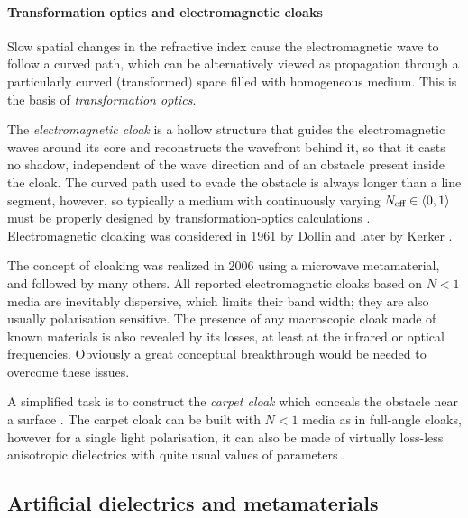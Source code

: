 \paragraph{Transformation optics and electromagnetic cloaks} %
Slow spatial changes in the refractive index cause the electromagnetic wave to follow a curved path, which can be alternatively viewed as propagation through a particularly curved (transformed) space filled with homogeneous medium. This is the basis of \textit{transformation optics}.

The \textit{electromagnetic cloak} is a hollow structure that guides the electromagnetic waves around its core and reconstructs the wavefront behind it, so that it casts no shadow, independent of the wave direction and of an obstacle present inside the cloak. 
The curved path used to evade the obstacle is always longer than a line segment, however, so typically a medium with continuously varying $N_{\text{eff} }\in \langle0,1\rangle$ must be properly designed by transformation-optics calculations \cite{eleftheriades2012transforming}.
Electromagnetic cloaking %
was considered in 1961 by Dollin \cite{dollin1961possibility} and later by Kerker \cite{kerker1975invisible}.

The concept of cloaking was realized \cite{schurig2006metamaterial} in 2006 using a microwave metamaterial, and followed by many others.
All reported electromagnetic cloaks based on $N<1$ media are inevitably dispersive, which limits their band width; they are also usually polarisation sensitive. The presence of any macroscopic cloak made of known materials is also revealed by its losses, at least at the infrared or optical frequencies. Obviously a great conceptual breakthrough would be needed to overcome these issues. 

A simplified task is to construct the \textit{carpet cloak} which conceals the obstacle near a surface \cite{valentine2009optical}.
The carpet cloak can be built with $N<1$ media as in full-angle cloaks, however for a single light polarisation, it can also be made  of virtually loss-less anisotropic dielectrics with quite usual values of parameters \cite{wang2013homogeneous}.


\subsection{Artificial dielectrics and metamaterials} 

